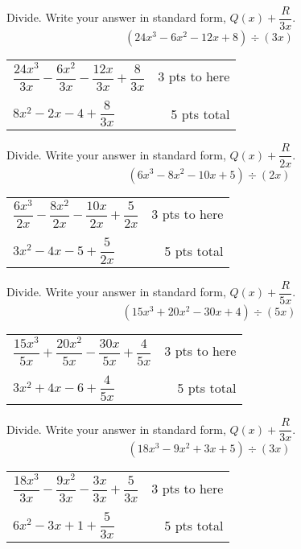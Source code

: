 {
	Divide. Write your answer in standard form, $Q(x)+\dfrac{R}{3x}$.
	$$(24x^3-6x^2-12x+8)\div(3x)$$
}
{
	\begin{tabular}{l r}
	$\dfrac{24x^3}{3x}-\dfrac{6x^2}{3x}-\dfrac{12x}{3x}+\dfrac{8}{3x}$ & 3 pts to here\\ \\
	$8x^2-2x-4+\dfrac{8}{3x} $ & 5 pts total
	\end{tabular}
}

{
	Divide. Write your answer in standard form, $Q(x)+\dfrac{R}{2x}$.
	$$(6x^3-8x^2-10x+5)\div(2x)$$
}
{
	\begin{tabular}{l r}
	$\dfrac{6x^3}{2x}-\dfrac{8x^2}{2x}-\dfrac{10x}{2x}+\dfrac{5}{2x}$  & 3 pts to here\\ \\
	$3x^2-4x-5+\dfrac{5}{2x}$ &  5 pts total
	\end{tabular}
}

{
	Divide. Write your answer in standard form, $Q(x)+\dfrac{R}{5x}$.
	$$(15x^3+20x^2-30x+4)\div(5x)$$
}
{
	\begin{tabular}{l r}
	$\dfrac{15x^3}{5x}+\dfrac{20x^2}{5x}-\dfrac{30x}{5x}+\dfrac{4}{5x}$  & 3 pts to here\\ \\
	$3x^2+4x-6+\dfrac{4}{5x}$ &  5 pts total
	\end{tabular}
}

{
	Divide. Write your answer in standard form, $Q(x)+\dfrac{R}{3x}$.
	$$(18x^3-9x^2+3x+5)\div(3x)$$
}
{
	\begin{tabular}{l r}
	$\dfrac{18x^3}{3x}-\dfrac{9x^2}{3x}-\dfrac{3x}{3x}+\dfrac{5}{3x}$ & 3 pts to here\\ \\
	$6x^2-3x+1+\dfrac{5}{3x} $ & 5 pts total
	\end{tabular}
}
